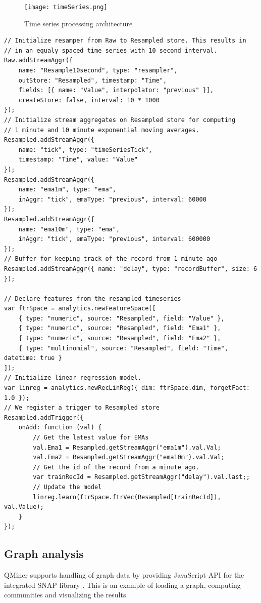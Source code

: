 \documentclass{article} %
\begin{document}
\begin{figure}[h]
\begin{center}
\texttt{[image: timeSeries.png]}
\end{center}
\caption{Time series processing architecture}
\end{figure}

\begin{lstlisting}[caption=Time series processing] 	
// Initialize resamper from Raw to Resampled store. This results in
// in an equaly spaced time series with 10 second interval.
Raw.addStreamAggr({
    name: "Resample10second", type: "resampler",
    outStore: "Resampled", timestamp: "Time",
    fields: [{ name: "Value", interpolator: "previous" }],
    createStore: false, interval: 10 * 1000
});
// Initialize stream aggregates on Resampled store for computing
// 1 minute and 10 minute exponential moving averages.
Resampled.addStreamAggr({
    name: "tick", type: "timeSeriesTick",
    timestamp: "Time", value: "Value"
});
Resampled.addStreamAggr({
    name: "ema1m", type: "ema",
    inAggr: "tick", emaType: "previous", interval: 60000
});
Resampled.addStreamAggr({
    name: "ema10m", type: "ema",
    inAggr: "tick", emaType: "previous", interval: 600000
});
// Buffer for keeping track of the record from 1 minute ago
Resampled.addStreamAggr({ name: "delay", type: "recordBuffer", size: 6 });

// Declare features from the resampled timeseries
var ftrSpace = analytics.newFeatureSpace([
    { type: "numeric", source: "Resampled", field: "Value" },
    { type: "numeric", source: "Resampled", field: "Ema1" },
    { type: "numeric", source: "Resampled", field: "Ema2" },
    { type: "multinomial", source: "Resampled", field: "Time", datetime: true }
]);
// Initialize linear regression model.
var linreg = analytics.newRecLinReg({ dim: ftrSpace.dim, forgetFact: 1.0 });
// We register a trigger to Resampled store
Resampled.addTrigger({
    onAdd: function (val) {
        // Get the latest value for EMAs
        val.Ema1 = Resampled.getStreamAggr("ema1m").val.Val;
        val.Ema2 = Resampled.getStreamAggr("ema10m").val.Val;
        // Get the id of the record from a minute ago.
        var trainRecId = Resampled.getStreamAggr("delay").val.last;;
        // Update the model
        linreg.learn(ftrSpace.ftrVec(Resampled[trainRecId]), val.Value);
    }
});

\end{lstlisting}


\subsection{Graph analysis}
QMiner supports handling of graph data by providing JavaScript API for the integrated SNAP library \cite{snap}. 
This is an example of loading a graph, computing communities and visualizing the results.
\end{document}
